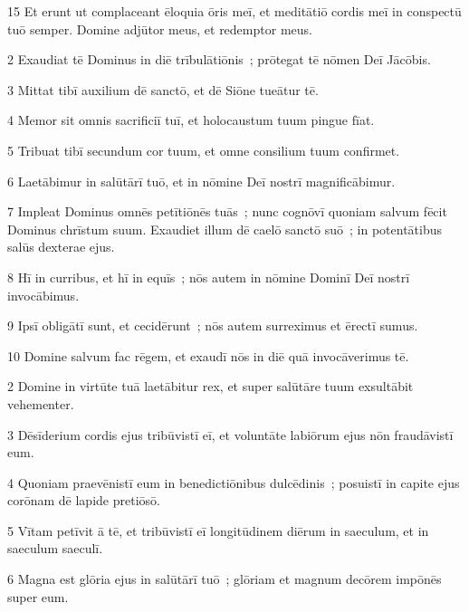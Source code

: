\psalmVerse
  {\phantom{0}15}
  {Et erunt ut complaceant ēloquia ōris meī, et meditātiō cordis meī in conspectū tuō semper. Domine adjūtor meus, et redemptor meus.}



\psalmVerse
  {\phantom{00}2}
  {Exaudiat tē Dominus in diē trībulātiōnis~; prōtegat tē nōmen Deī Jācōbis.}


\psalmVerse
  {\phantom{00}3}
  {Mittat tibī auxilium dē sanctō, et dē Siōne tueātur tē.}


\psalmVerse
  {\phantom{00}4}
  {Memor sit omnis sacrificiī tuī, et holocaustum tuum pingue fīat.}


\psalmVerse
  {\phantom{00}5}
  {Tribuat tibī secundum cor tuum, et omne consilium tuum confirmet.}


\psalmVerse
  {\phantom{00}6}
  {Laetābimur in salūtārī tuō, et in nōmine Deī nostrī magnificābimur.}


\psalmVerse
  {\phantom{00}7}
  {Impleat Dominus omnēs petītiōnēs tuās~; nunc cognōvī quoniam salvum fēcit Dominus chrīstum suum. Exaudiet illum dē caelō sanctō suō~; in potentātibus salūs dexterae ejus.}


\psalmVerse
  {\phantom{00}8}
  {Hī in curribus, et hī in equīs~; nōs autem in nōmine Dominī Deī nostrī invocābimus.}


\psalmVerse
  {\phantom{00}9}
  {Ipsī obligātī sunt, et cecidērunt~; nōs autem surreximus et ērectī sumus.}


\psalmVerse
  {\phantom{0}10}
  {Domine salvum fac rēgem, et exaudī nōs in diē quā invocāverimus tē.}



\psalmVerse
  {\phantom{00}2}
  {Domine in virtūte tuā laetābitur rex, et super salūtāre tuum exsultābit vehementer.}


\psalmVerse
  {\phantom{00}3}
  {Dēsīderium cordis ejus tribūvistī eī, et voluntāte labiōrum ejus nōn fraudāvistī eum.}


\psalmVerse
  {\phantom{00}4}
  {Quoniam praevēnistī eum in benedictiōnibus dulcēdinis~; posuistī in capite ejus corōnam dē lapide pretiōsō.}


\psalmVerse
  {\phantom{00}5}
  {Vītam petīvit ā tē, et tribūvistī eī longitūdinem diērum in saeculum, et in saeculum saeculī.}


\psalmVerse
  {\phantom{00}6}
  {Magna est glōria ejus in salūtārī tuō~; glōriam et magnum decōrem impōnēs super eum.}


